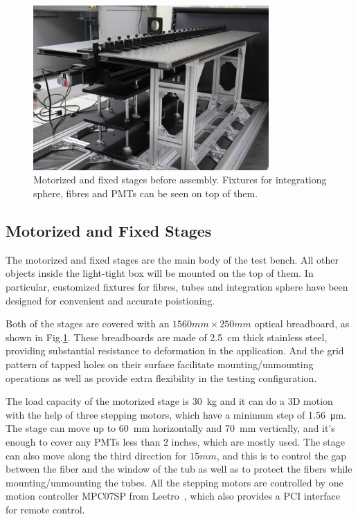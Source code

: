 \documentclass[review, times]{elsarticle}
\begin{document}
\begin{figure}
 \centering
 \includegraphics[width=90mm]{stage1_crop}
\caption{Motorized and fixed stages before assembly.
Fixtures for integrationg sphere, fibres and PMTs can be seen on top of them.}
\label{fig:stages}
\end{figure} 

\subsection{Motorized and Fixed Stages}
\label{sec:stages}

The motorized and fixed stages are the main body of the test bench.
All other objects inside the light-tight box will be mounted on the top of them.
In particular, customized fixtures for fibres, tubes and integration sphere have been designed for convenient and accurate poistioning.

Both of the stages are covered with an $1560mm\times250mm$ optical breadboard, as shown in Fig.\ref{fig:stages}.
These breadboards are made of \SI{2.5}{cm} thick stainless steel, providing substantial resistance to deformation in the application. 
And the grid pattern of tapped holes on their surface facilitate mounting/unmounting operations as well as provide extra flexibility in the testing configuration.

The load capacity of the motorized stage is \SI{30}{\kilo\gram} and it can do a 3D motion with the help of three stepping motors, which have a minimum step of \SI{1.56}{\micro\meter}.
The stage can move up to \SI{60}{\milli\meter} horizontally and \SI{70}{\milli\meter} vertically, and it's enough to cover any PMTs less than 2 inches, which are mostly used.
The stage can also move along the third direction for $15mm$, and this is to control the gap between the fiber and the window of the tub as well as to protect the fibers while mounting/unmounting the tubes.
All the stepping motors are controlled by one motion controller MPC07SP from Leetro~\cite{leetro}, which also provides a PCI interface for remote control.
\end{document}
